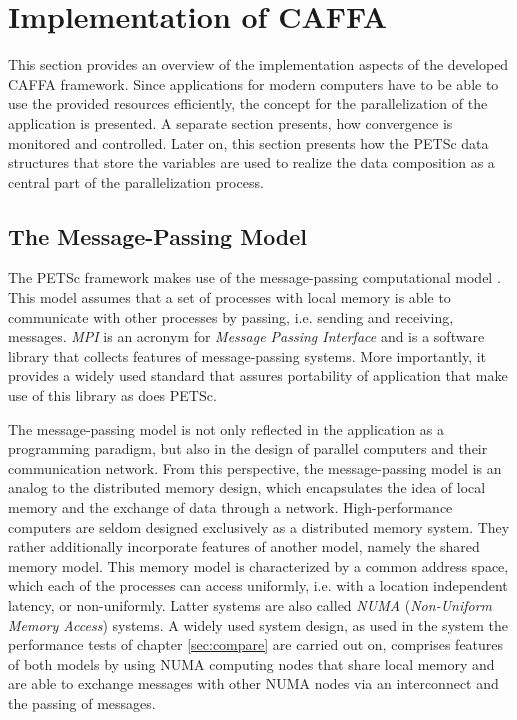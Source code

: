 \section{Implementation of CAFFA}
\label{sec:caffaimpl}

This section provides an overview of the implementation aspects of the developed CAFFA framework. Since applications for modern computers have to be able to use the provided resources efficiently, the concept for the parallelization of the application is presented. A separate section presents, how convergence is monitored and controlled. Later on, this section presents how the PETSc data structures that store the variables are used to realize the data composition as a central part of the parallelization process.

\subsection{The Message-Passing Model}

The PETSc framework makes use of the message-passing computational model \cite{gropp99}. This model assumes that a set of processes with local memory is able to communicate with other processes by passing, i.e. sending and receiving, messages. \emph{MPI} is an acronym for \emph{Message Passing Interface} and is a software library that collects features of message-passing systems. More importantly, it provides a widely used standard that assures portability of application that make use of this library as does PETSc. 

The message-passing model is not only reflected in the application as a programming paradigm, but also in the design of parallel computers and their communication network. From this perspective, the message-passing model is an analog to the distributed memory design, which encapsulates the idea of local memory and the exchange of data through a network. High-performance computers are seldom designed exclusively as a distributed memory system. They rather additionally incorporate features of another model, namely the shared memory model. This memory model is characterized by a common address space, which each of the processes can access uniformly, i.e. with a location independent latency, or non-uniformly. Latter systems are also called \emph{NUMA} (\emph{Non-Uniform Memory Access}) systems. A widely used system design, as used in the system the performance tests of chapter \ref{sec:compare} are carried out on, comprises features of both models by using NUMA computing nodes that share local memory and are able to exchange messages with other NUMA nodes via an interconnect and the passing of messages.


